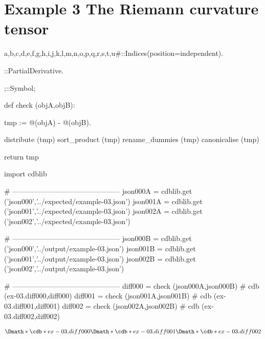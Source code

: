 \documentclass[12pt]{cdblatex}
\begin{document}
\section*{Example 3 The Riemann curvature tensor}

\begin{cadabra}
   {a,b,c,d,e,f,g,h,i,j,k,l,m,n,o,p,q,r,s,t,u#}::Indices(position=independent).

   \partial{#}::PartialDerivative.

   ;::Symbol;

   def check (objA,objB):

       tmp := @(objA) - @(objB).

       distribute     (tmp)
       sort_product   (tmp)
       rename_dummies (tmp)
       canonicalise   (tmp)

       return tmp

   import cdblib

   # ---------------------------------------------
   json000A = cdblib.get ('json000','../expected/example-03.json')
   json001A = cdblib.get ('json001','../expected/example-03.json')
   json002A = cdblib.get ('json002','../expected/example-03.json')

   # ---------------------------------------------
   json000B = cdblib.get ('json000','../output/example-03.json')
   json001B = cdblib.get ('json001','../output/example-03.json')
   json002B = cdblib.get ('json002','../output/example-03.json')

   # ---------------------------------------------
   diff000 = check (json000A,json000B)   # cdb (ex-03.diff000,diff000)
   diff001 = check (json001A,json001B)   # cdb (ex-03.diff001,diff001)
   diff002 = check (json002A,json002B)   # cdb (ex-03.diff002,diff002)

\end{cadabra}

\clearpage

\begin{dgroup*}
   \Dmath*{\cdb*{ex-03.diff000}}
   \Dmath*{\cdb*{ex-03.diff001}}
   \Dmath*{\cdb*{ex-03.diff002}}
\end{dgroup*}
\end{document}
